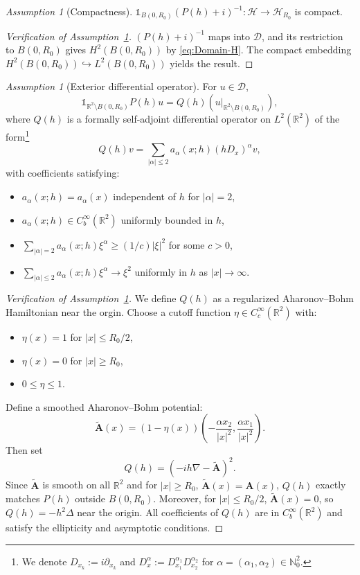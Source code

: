 \documentclass[11pt]{amsart}
\theoremstyle{remark}
\newtheorem{assumption}[theorem]{Assumption}
\newcommand{\bA}{\mathbf{A}}
\newcommand{\R}{\mathbb{R}}
\numberwithin{equation}{section}
\begin{document}
\begin{assumption}[Compactness]\label{Ass:C}
$\mathbb{1}_{B(0,R_0)} (P(h) + i)^{-1} : \mathcal{H} \to \mathcal{H}_{R_0}$ is compact.
\end{assumption}

\begin{proof}[Verification of Assumption~\ref{Ass:C}]
$(P(h)+i)^{-1}$ maps into $\mathcal{D}$, and its restriction to $B(0,R_0)$ gives $H^2(B(0,R_0))$ by \eqref{eq:Domain-H}.  The compact embedding $H^2(B(0,R_0)) \hookrightarrow L^2(B(0,R_0))$ yields the result.
\end{proof}

\begin{assumption}[Exterior differential operator]\label{ass:ext-op}
For $u \in \mathcal{D}$,
\[
\mathbb{1}_{\R^2 \setminus B(0,R_0)} P(h) u = Q(h)(u|_{\R^2 \setminus B(0,R_0)}),
\]
where $Q(h)$ is a formally self-adjoint differential operator on $L^2(\R^2)$ of the form\footnote{We denote $D_{x_k}:=i\partial_{x_k}$ and  $D_x^{\alpha}:=D_{x_1}^{\alpha_1}D_{x_2}^{\alpha_2}$ for $\alpha=(\alpha_1,\alpha_2)\in\mathbb N_0^2$.}
\[
Q(h)v = \sum_{|\alpha| \leq 2} a_\alpha(x;h)(hD_x)^\alpha v,
\]
with coefficients satisfying:
\begin{itemize}
    \item $a_\alpha(x;h) = a_\alpha(x)$ independent of $h$ for $|\alpha| = 2$,
    \item $a_\alpha(x;h) \in C_b^\infty(\R^2)$ uniformly bounded in $h$,
    \item $\sum_{|\alpha|=2} a_\alpha(x;h)\xi^\alpha \geq (1/c)|\xi|^2$ for some $c > 0$,
    \item $\sum_{|\alpha| \leq 2} a_\alpha(x;h)\xi^\alpha \to \xi^2$ uniformly in $h$ as $|x| \to \infty$.
\end{itemize}
\end{assumption}
%
\begin{proof}[Verification of Assumption~\ref{ass:ext-op}]
%
We define $Q(h)$ as a regularized Aharonov--Bohm Hamiltonian near the orgin. Choose a cutoff function $\eta \in C_c^\infty(\R^2)$ with:
\begin{itemize}
\item $\eta(x) = 1$ for $|x| \le R_0/2$,
\item $\eta(x) = 0$ for $|x| \ge R_0$,
\item $0 \le \eta \le 1$.
\end{itemize}
%
Define a smoothed Aharonov–Bohm potential:
\begin{equation}\label{eq:reg AB}
\tilde{\bA}(x) =  (1 - \eta(x))\left(-\frac{\alpha x_2}{|x|^2},\frac{ \alpha x_1}{|x|^2}\right).
\end{equation}
%
Then set
\[
Q(h) = (-ih\nabla - \tilde{\bA})^2.\]
Since
$\tilde{\bA}$ is smooth on all $\R^2$ and for $|x| \ge R_0$,  $\tilde{\bA}(x) =\bA(x)$, $Q(h)$ exactly  matches $P(h)$ outside $B(0,R_0)$.
Moreover, for $|x| \le R_0/2$, $\tilde{\bA}(x) = 0$, so $Q(h) = -h^2\Delta$ near the origin.
All coefficients of $Q(h)$ are in $C_b^\infty(\R^2)$ and satisfy the ellipticity and asymptotic conditions.
\end{proof}
\end{document}
